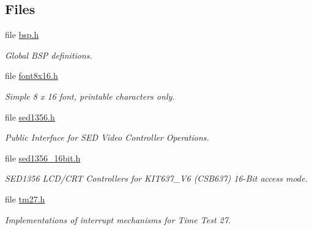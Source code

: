 \subsection*{Files}
\begin{DoxyCompactItemize}
\item 
file \mbox{\hyperlink{bsps_2arm_2csb337_2include_2bsp_8h}{bsp.\+h}}
\begin{DoxyCompactList}\small\item\em Global B\+SP definitions. \end{DoxyCompactList}\item 
file \mbox{\hyperlink{font8x16_8h}{font8x16.\+h}}
\begin{DoxyCompactList}\small\item\em Simple 8 x 16 font, printable characters only. \end{DoxyCompactList}\item 
file \mbox{\hyperlink{sed1356_8h}{sed1356.\+h}}
\begin{DoxyCompactList}\small\item\em Public Interface for S\+ED Video Controller Operations. \end{DoxyCompactList}\item 
file \mbox{\hyperlink{sed1356__16bit_8h}{sed1356\+\_\+16bit.\+h}}
\begin{DoxyCompactList}\small\item\em S\+E\+D1356 L\+C\+D/\+C\+RT Controllers for K\+I\+T637\+\_\+\+V6 (C\+S\+B637) 16-\/Bit access mode. \end{DoxyCompactList}\item 
file \mbox{\hyperlink{arm_2csb337_2include_2tm27_8h}{tm27.\+h}}
\begin{DoxyCompactList}\small\item\em Implementations of interrupt mechanisms for Time Test 27. \end{DoxyCompactList}\end{DoxyCompactItemize}
